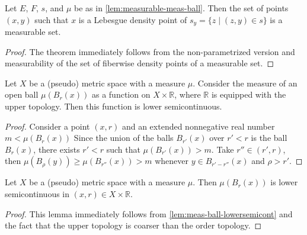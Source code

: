 \begin{corollary}%
  \label{cor:measurable-density}
  \leanok%
  Let \(E\), \(F\), \(s\), and \(\mu\) be as in \autoref{lem:measurable-meas-ball}.
  Then the set of points \((x, y)\) such that \(x\) is a Lebesgue density point of \(s_{y} = \{z \mid (z, y) \in s\}\)
  is a measurable set.
\end{corollary}
\begin{proof}
  \leanok%
  The theorem immediately follows from the non-parametrized version
  and measurability of the set of fiberwise density points of a measurable set.
\end{proof}

\begin{lemma}%
  \label{lem:meas-ball-lowersemicont}
  \leanok%
  Let \(X\) be a (pseudo) metric space with a measure \(\mu\).
  Consider the measure of an open ball \(\mu(B_{r}(x))\) as a function on \(X\times\mathbb R\),
  where \(\mathbb R\) is equipped with the upper topology.
  Then this function is lower semicontinuous.
\end{lemma}

\begin{proof}
  \leanok%
  Consider a point \((x, r)\) and an extended nonnegative real number \(m < \mu(B_{r}(x))\)
  Since the union of the balls \(B_{r'}(x)\) over \(r' < r\) is the ball \(B_{r}(x)\),
  there exists \(r' < r\) such that \(\mu\left(B_{r'}(x)\right) > m\).
  Take \(r'' \in (r', r)\), then \(\mu\left(B_{\rho}(y)\right) \ge \mu\left(B_{r''}(x)\right)> m\)
  whenever \(y\in B_{r' - r''}(x)\) and \(\rho > r'\).
\end{proof}

\begin{corollary}%
  \label{cor:meas-ball-lowersemicont}
  \leanok%
  Let \(X\) be a (pseudo) metric space with a measure \(\mu\).
  Then \(\mu(B_{r}(x))\) is lower semicontinuous in \((x, r)\in X\times\mathbb R\).
\end{corollary}

\begin{proof}
  \leanok%
  This lemma immediately follows from \autoref{lem:meas-ball-lowersemicont}
  and the fact that the upper topology is coarser than the order topology.
\end{proof}

